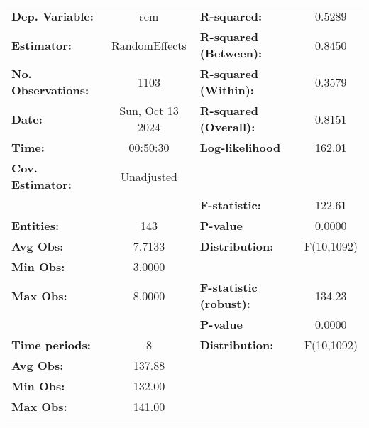 \documentclass{article}
\begin{document}
\begin{center}
\begin{tabular}{lclc}
\toprule
\textbf{Dep. Variable:}    &        sem         & \textbf{  R-squared:         }   &      0.5289      \\
\textbf{Estimator:}        &   RandomEffects    & \textbf{  R-squared (Between):}  &      0.8450      \\
\textbf{No. Observations:} &        1103        & \textbf{  R-squared (Within):}   &      0.3579      \\
\textbf{Date:}             &  Sun, Oct 13 2024  & \textbf{  R-squared (Overall):}  &      0.8151      \\
\textbf{Time:}             &      00:50:30      & \textbf{  Log-likelihood     }   &      162.01      \\
\textbf{Cov. Estimator:}   &     Unadjusted     & \textbf{                     }   &                  \\
\textbf{}                  &                    & \textbf{  F-statistic:       }   &      122.61      \\
\textbf{Entities:}         &        143         & \textbf{  P-value            }   &      0.0000      \\
\textbf{Avg Obs:}          &       7.7133       & \textbf{  Distribution:      }   &    F(10,1092)    \\
\textbf{Min Obs:}          &       3.0000       & \textbf{                     }   &                  \\
\textbf{Max Obs:}          &       8.0000       & \textbf{  F-statistic (robust):} &      134.23      \\
\textbf{}                  &                    & \textbf{  P-value            }   &      0.0000      \\
\textbf{Time periods:}     &         8          & \textbf{  Distribution:      }   &    F(10,1092)    \\
\textbf{Avg Obs:}          &       137.88       & \textbf{                     }   &                  \\
\textbf{Min Obs:}          &       132.00       & \textbf{                     }   &                  \\
\textbf{Max Obs:}          &       141.00       & \textbf{                     }   &                  \\
\textbf{}                  &                    & \textbf{                     }   &                  \\
\bottomrule

\end{tabular}
\end{center}
\end{document}
